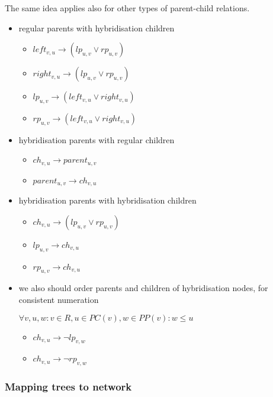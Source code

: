 \documentclass[runningheads, envcountsame, a4paper]{llncs}
\begin{document}
The same idea applies also for other types of parent-child relations.

\begin{itemize}
\item regular parents with hybridisation children
    \begin{itemize}
    \item $left_{v,u} \rightarrow (lp_{u,v} \vee rp_{u,v})$
    \item $right_{v,u} \rightarrow (lp_{u,v} \vee rp_{u,v})$
    \item $lp_{u,v} \rightarrow (left_{v,u} \vee right_{v,u})$
    \item $rp_{u,v} \rightarrow (left_{v,u} \vee right_{v,u})$
    \end{itemize}
    
\item hybridisation parents with regular children
    \begin{itemize}
    \item $ch_{v,u} \rightarrow parent_{u,v}$
    \item $parent_{u,v} \rightarrow ch_{v,u}$
    \end{itemize}
    
\item hybridisation parents with hybridisation children
    \begin{itemize}
    \item $ch_{v,u} \rightarrow (lp_{u,v} \vee rp_{u,v})$
    \item $lp_{u,v} \rightarrow ch_{v,u}$
    \item $rp_{u,v} \rightarrow ch_{v,u}$
    \end{itemize}
    
\item we also should order parents and children of hybridisation nodes, for consistent numeration

	$\forall v, u, w: v \in R, u \in PC(v), w \in PP(v): w \leq u$
    \begin{itemize}
    \item $ch_{v,u} \rightarrow \neg lp_{v,w}$
    \item $ch_{v,u} \rightarrow \neg rp_{v,w}$
    \end{itemize}

\end{itemize}

\subsubsection{Mapping trees to network}
\end{document}
